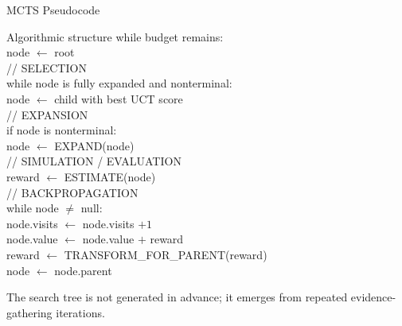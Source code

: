 \documentclass[aspectratio=169,10pt]{beamer}
\begin{document}
\begin{frame}[shrink=14]{MCTS Pseudocode}
  \begin{block}{Algorithmic structure}
  \ttfamily\scriptsize
  while budget remains:\\
  \quad node $\leftarrow$ root\\[0.03in]
  \quad // SELECTION\\
  \quad while node is fully expanded and nonterminal:\\
  \qquad node $\leftarrow$ child with best UCT score\\[0.03in]
  \quad // EXPANSION\\
  \quad if node is nonterminal:\\
  \qquad node $\leftarrow$ EXPAND(node)\\[0.03in]
  \quad // SIMULATION / EVALUATION\\
  \quad reward $\leftarrow$ ESTIMATE(node)\\[0.03in]
  \quad // BACKPROPAGATION\\
  \quad while node $\neq$ null:\\
  \qquad node.visits $\leftarrow$ node.visits $+1$\\
  \qquad node.value $\leftarrow$ node.value $+$ reward\\
  \qquad reward $\leftarrow$ TRANSFORM\_FOR\_PARENT(reward)\\
  \qquad node $\leftarrow$ node.parent
  \end{block}
  \begin{keyidea}
    The search tree is not generated in advance; it emerges from repeated evidence-gathering iterations.
  \end{keyidea}
\end{frame}
\end{document}
